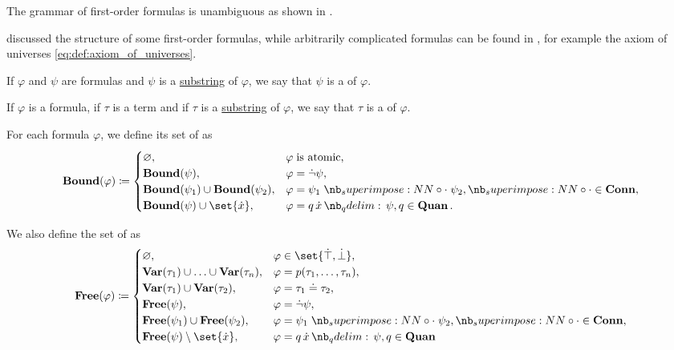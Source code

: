\begin{definition}
\begin{thmenum}
    The grammar of first-order formulas is unambiguous as shown in .

     discussed the structure of some first-order formulas, while arbitrarily complicated formulas can be found in , for example the axiom of universes \eqref{eq:def:axiom_of_universes}.

     If \( \varphi \) and \( \psi \) are formulas and \( \psi \) is a \hyperref[def:formal_language/occurrence]{substring} of \( \varphi \), we say that \( \psi \) is a  of \( \varphi \).

     If \( \varphi \) is a formula, if \( \tau \) is a term and if \( \tau \) is a \hyperref[def:formal_language/occurrence]{substring} of \( \varphi \), we say that \( \tau \) is a  of \( \varphi \).

     For each formula \( \varphi \), we define its set of  as
    \begin{equation*}
      \op*{Bound}(\varphi) \coloneqq \begin{cases}
        \varnothing,                                        &\varphi \T{is atomic,} \\
        \op*{Bound}(\psi),                               &\varphi = \synneg \psi, \\
        \op*{Bound}(\psi_1) \cup \op*{Bound}(\psi_2), &\varphi = \psi_1 \syncirc \psi_2, {\syncirc} \in \op*{Conn}, \\
        \op*{Bound}(\psi) \cup \set{ \synx },              &\varphi = \quantifier{q}{\synx} \psi, q \in \op*{Quan}.
      \end{cases}
    \end{equation*}

     We also define the set of  as
    \begin{equation*}
      \op*{Free}(\varphi) \coloneqq \begin{cases}
        \varnothing,                                                &\varphi \in \set{ \syntop, \synbot }, \\
        \op*{Var}(\tau_1) \cup \ldots \cup \op*{Var}(\tau_n), &\varphi = p(\tau_1, \ldots, \tau_n), \\
        \op*{Var}(\tau_1) \cup \op*{Var}(\tau_2),             &\varphi = \tau_1 \syneq \tau_2, \\
        \op*{Free}(\psi),                                        &\varphi = \synneg \psi, \\
        \op*{Free}(\psi_1) \cup \op*{Free}(\psi_2),           &\varphi = \psi_1 \syncirc \psi_2, {\syncirc} \in \op*{Conn}, \\
        \op*{Free}(\psi) \setminus \set{ \synx },                  &\varphi = \quantifier{q}{\synx} \psi, q \in \op*{Quan}
      \end{cases}
    \end{equation*}


\end{thmenum}
\end{definition}
